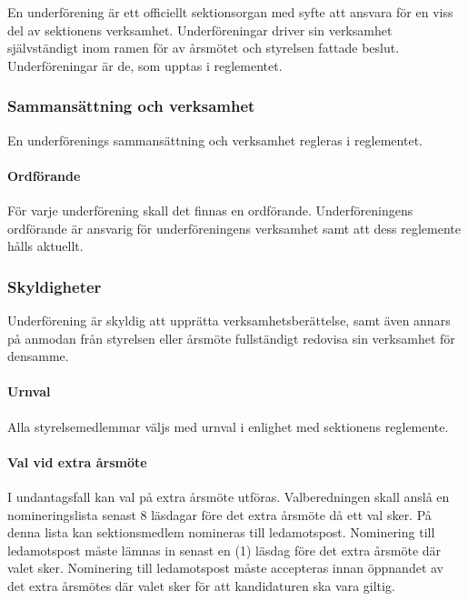 \documentclass{../resources/dgovdoc}
\begin{document}
En underförening är ett officiellt sektionsorgan med syfte att ansvara för en viss del
av sektionens verksamhet. Underföreningar driver sin verksamhet självständigt inom
ramen för av årsmötet och styrelsen fattade beslut. Underföreningar är de, som upptas i
reglementet.

\subsubsection{Sammansättning och verksamhet}

En underförenings sammansättning och verksamhet regleras i reglementet.

\paragraph{Ordförande}

För varje underförening skall det finnas en ordförande.
Underföreningens ordförande är ansvarig för underföreningens verksamhet samt att dess
reglemente hålls aktuellt.

\subsubsection{Skyldigheter}

Underförening är skyldig att upprätta verksamhetsberättelse, samt även annars på
anmodan från styrelsen eller årsmöte fullständigt redovisa sin verksamhet för
densamme.

\paragraph{Urnval}

Alla styrelsemedlemmar väljs med urnval i enlighet med sektionens
reglemente.

\paragraph{Val vid extra årsmöte}

I undantagsfall kan val på extra årsmöte utföras. Valberedningen skall anslå
en nomineringslista senast 8 läsdagar före det extra årsmöte då ett val sker. På denna lista
kan sektionsmedlem nomineras till ledamotspost. Nominering till ledamotspost
måste lämnas in senast en (1) läsdag före det extra årsmöte där valet sker. Nominering till
ledamotspost måste accepteras innan öppnandet av det extra årsmötes där valet sker för
att kandidaturen ska vara giltig.
\end{document}

